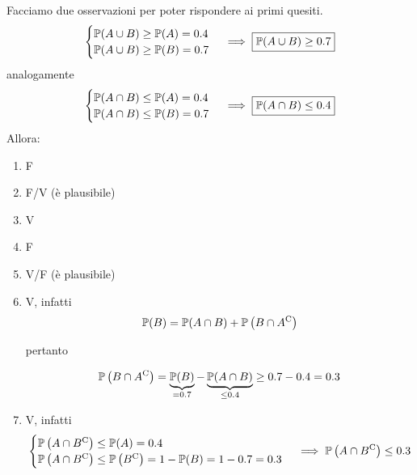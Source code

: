 Facciamo due osservazioni per poter rispondere ai primi quesiti.
\begin{equation*}
\begin{cases}
\P( A\cup B) \geq \P( A) =0.4\\
\P( A\cup B) \geq \P( B) =0.7
\end{cases} \implies  \boxed{\P( A\cup B) \geq 0.7}
\end{equation*}
analogamente
\begin{equation*}
\begin{cases}
\P( A\cap B) \leq \P( A) =0.4\\
\P( A\cap B) \leq \P( B) =0.7
\end{cases} \implies  \boxed{\P( A\cap B) \leq 0.4}
\end{equation*}
Allora:
\begin{enumerate}
\item F
\item F/V (è plausibile)
\item V
\item F
\item V/F (è plausibile)
\item V, infatti\begin{equation*}
\P( B) =\P( A\cap B) +\P\left( B\cap A\comp\right)
\end{equation*}

pertanto

\begin{equation*}
\P\left( B\cap A\comp\right) =\underbrace{\P( B)}_{=0.7} -\underbrace{\P( A\cap B)}_{\leq 0.4} \geq 0.7-0.4=0.3
\end{equation*}
\item V, infatti\begin{equation*}
\begin{cases}
\P\left( A\cap B\comp\right) \leq \P( A) =0.4\\
\P\left( A\cap B\comp\right) \leq \P\left( B\comp\right) =1-\P( B) =1-0.7=0.3
\end{cases}\implies \mathbb{P}\left( A\cap B\comp\right) \leq 0.3
\end{equation*}
\end{enumerate}
\Soluzione
